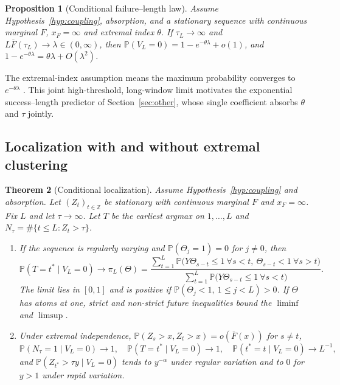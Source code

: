 \documentclass{article}
\newtheorem{proposition}{Proposition}
\newtheorem{theorem}[proposition]{Theorem}
\newcommand{\Fbar}{\overline{F}}
\newcommand{\PP}{\mathbb{P}}
\newcommand{\1}{\mathbf{1}}
\begin{document}
\begin{proposition}[Conditional failure--length law]\label{prop:length}
Assume Hypothesis~\ref{hyp:coupling}, absorption, and a stationary sequence with continuous marginal $F$, $x_F=\infty$ and extremal index $\theta$. If $\tau_L\to\infty$ and $L\Fbar(\tau_L)\to\lambda\in(0,\infty)$, then $\PP(V_L=0)=1-e^{-\theta\lambda}+o(1)$, and $1-e^{-\theta\lambda}=\theta\lambda+O(\lambda^2)$.
\end{proposition}
The extremal-index assumption means the maximum probability converges to $e^{-\theta\lambda}$ \citep{leadbetter1983}. This joint high-threshold, long-window limit motivates the exponential success--length predictor of Section~\ref{sec:other}, whose single coefficient absorbs $\theta$ and $\tau$ jointly.

\subsection{Localization with and without extremal clustering}

\begin{theorem}[Conditional localization]\label{thm:loc}
Assume Hypothesis~\ref{hyp:coupling} and absorption. Let $(Z_t)_{t\in\mathbb{Z}}$ be stationary with continuous marginal $F$ and $x_F=\infty$. Fix $L$ and let $\tau\to\infty$. Let $T$ be the earliest argmax on $1,\dots,L$ and $N_\tau=\#\{t\le L:Z_t>\tau\}$.
\begin{enumerate}
\item[(i)] If the sequence is regularly varying and $\PP(\Theta_j=1)=0$ for $j\ne0$, then
\begin{equation}\label{eq:piL}
\PP(T=t^*\mid V_L=0)\to\pi_L(\Theta)=\frac{\sum_{t=1}^{L}\PP\bigl(Y\Theta_{s-t}\le1\ \forall s<t,\ \Theta_{s-t}<1\ \forall s>t\bigr)}{\sum_{t=1}^{L}\PP\bigl(Y\Theta_{s-t}\le1\ \forall s<t\bigr)}.
\end{equation}
The limit lies in $[0,1]$ and is positive if $\PP(\Theta_j<1,\ 1\le j<L)>0$. If $\Theta$ has atoms at one, strict and non-strict future inequalities bound the $\liminf$ and $\limsup$.
\item[(ii)] Under extremal independence, $\PP(Z_s>x,Z_t>x)=o(\Fbar(x))$ for $s\ne t$,
\begin{equation}\label{eq:indep}
\PP(N_\tau=1\mid V_L=0)\to1,\quad \PP(T=t^*\mid V_L=0)\to1,\quad \PP(t^*=t\mid V_L=0)\to L^{-1},
\end{equation}
and $\PP(Z_{t^*}>\tau y\mid V_L=0)$ tends to $y^{-\alpha}$ under regular variation and to $0$ for $y>1$ under rapid variation.
\end{enumerate}
\end{theorem}
\end{document}
